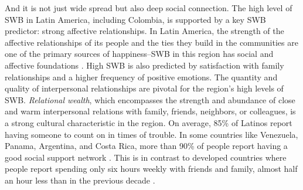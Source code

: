 \documentclass[10pt, letterpaper]{article}
\begin{document}
\begin{spacing}{2}
And it is not just wide spread but also deep social connection. 
The high level of SWB in Latin America, including Colombia,  is supported
by a key SWB predictor: strong affective relationships. In Latin America, the strength of the affective relationships of its people and the ties they
build in the communities are one of the  primary sources of happiness--SWB in this region has social and affective foundations
\citep{yamamoto16,rojas15}. High SWB is also predicted by satisfaction with family relationships and a higher frequency of positive
emotions. The quantity and quality of interpersonal relationships are pivotal
for the region's high levels of SWB. {\it Relational wealth}, which encompasses the strength and abundance of close and warm interpersonal relations with
family, friends, neighbors, or colleagues, is a strong cultural characteristic in the region. On average, 85\% of Latinos
 report having someone to count on in times of trouble. In some countries like Venezuela, Panama, Argentina,
and Costa Rica, more than 90\% of people report having a good social support
network \citep{rojas2019well}.
 This is in contrast to developed countries where people report
spending only six hours weekly with friends and family, almost half an hour less
than in the previous decade %
\citep{van2020s}.




\end{spacing}
\end{document}

